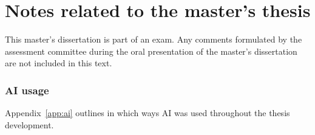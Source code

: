 \chapter*{Notes related to the master's thesis}

This master's dissertation is part of an exam. Any comments formulated by the assessment committee during the oral presentation of the master's dissertation are not included in this text.

\subsection*{AI usage}

Appendix~\ref{app:ai} outlines in which ways AI was used throughout the thesis development.